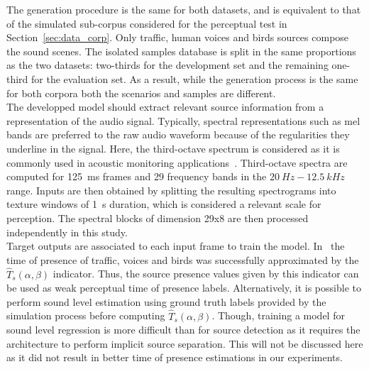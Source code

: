 \documentclass[11pt,a4paper]{article}
\begin{document}
The generation procedure is the same for both datasets, and is equivalent to that of the simulated sub-corpus considered for the perceptual test in Section~\ref{sec:data_corp}. Only traffic, human voices and birds sources compose the sound scenes. The isolated samples database is split in the same proportions as the two datasets: two-thirds for the development set and the remaining one-third for the evaluation set. As a result, while the generation process is the same for both corpora both the scenarios and samples are different.\\

The developped model should extract relevant source information from a representation of the audio signal. Typically, spectral representations such as mel bands are preferred to the raw audio waveform because of the regularities they underline in the signal. Here, the third-octave spectrum is considered as it is commonly used in acoustic monitoring applications~\cite{ardouin2018, gontier2017}. Third-octave spectra are computed for 125~ms frames and 29 frequency bands in the $20~Hz - 12.5~kHz$ range. Inputs are then obtained by splitting the resulting spectrograms into texture windows of 1~s duration, which is considered a relevant scale for perception. The spectral blocks of dimension 29x8 are then processed independently in this study.\\

Target outputs are associated to each input frame to train the model. In~\cite{gontier2018} the time of presence of traffic, voices and birds was successfully approximated by the $\hat T_s(\alpha, \beta)$ indicator. Thus, the source presence values given by this indicator can be used as weak perceptual time of presence labels. Alternatively, it is possible to perform sound level estimation using ground truth labels provided by the simulation process before computing $\hat T_s(\alpha, \beta)$. Though, training a model for sound level regression is more difficult than for source detection as it requires the architecture to perform implicit source separation. This will not be discussed here as it did not result in better time of presence estimations in our experiments.\\
\end{document}
